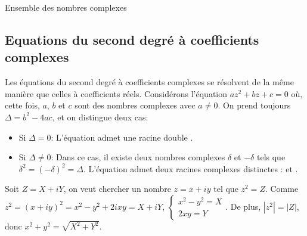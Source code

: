 \begin{chapter}{Ensemble des nombres complexes}
\subsection{Equations du second degr\'e \`a coefficients complexes}
%
%
Les \'equations du second degr\'e \`a coefficients complexes se r\'esolvent de la m\^eme mani\`ere que celles \`a coefficients r\'eels.
Consid\'erons l'\'equation $a z^2 + b z + c = 0$ o\`u, cette fois, $a$, $b$ et $c$ sont des nombres complexes avec $a\neq0$.
On prend toujours $\Delta = b^2 - 4ac$, et on distingue deux cas:
\begin{itemize}
\item Si $\Delta = 0$:
     L'\'equation admet une racine double .
\item Si $\Delta \neq 0$:
	     Dans ce cas, il existe deux nombres complexes $\delta$ et $-\delta$ tels que $\delta ^2 = (- \delta)^2 = \Delta$.
	     L'\'equation admet deux racines complexes distinctes :  et .
\end{itemize}
%
\begin{methode}
      Soit $Z=X+iY$, on veut chercher un nombre $z=x+iy$ tel que $z^2 = Z$.
      Comme $z^2 = (x+iy)^2 = x^2 - y^2 + 2ixy = X + iY$, 
            $
                  \left\lbrace
                        \begin{array}{l}
                              x^2 - y^2 = X \\
                              2xy = Y       
                        \end{array}
                  \right. 
            $.
      De plus, $|z^2| = |Z|$, donc $x^2 + y^2 = \sqrt{X^2 + Y^2}$.
      

\end{methode}
\end{chapter}
